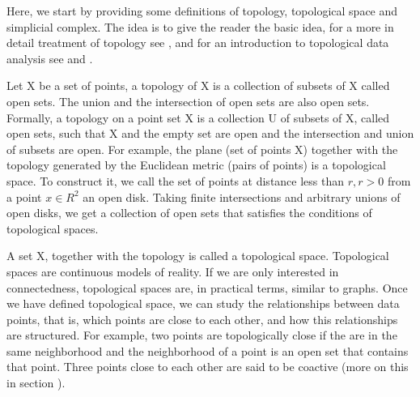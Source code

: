 \documentclass[onecollarge,runningheads]{svjour2}
\begin{document}

Here, we start by providing some definitions of topology, topological space and simplicial complex. The idea is to give the reader the basic idea, for a more in detail treatment of topology see \cite{munkres1984elements}, \cite{hatcher2001} and for an introduction to topological data analysis see \cite{carlsson2009topology} and \cite{wasserman2016topological}. 

Let X be a set of points, a topology of X is a collection of subsets of X called open sets. The union and the intersection of open sets are also open sets.
Formally, a topology on a point set X is a collection U of subsets of X, called open sets, such that X and the empty set are open and the intersection and union of subsets are open.
For example, the plane (set of points X) together with the topology generated by the Euclidean metric (pairs of points) is a topological space. To construct it, we call the set of points at distance less than $r, r > 0$ from a point $x \in R^2$ an open disk. Taking finite intersections and arbitrary unions of open disks, we get a collection of open sets that satisfies the conditions of topological spaces. 

A set X, together with the topology is called a topological space. Topological spaces are continuous models of reality. If we are only interested in connectedness, topological spaces are, in practical terms, similar to graphs.
Once we have defined topological space, we can study the relationships between data points, that is, which points are close to each other, and how this relationships are structured. For example, two points are topologically close if the are in the same neighborhood and the neighborhood of a point is an open set that contains that point. 
Three points close to each other are said to be coactive (more on this in section ).
\end{document}
